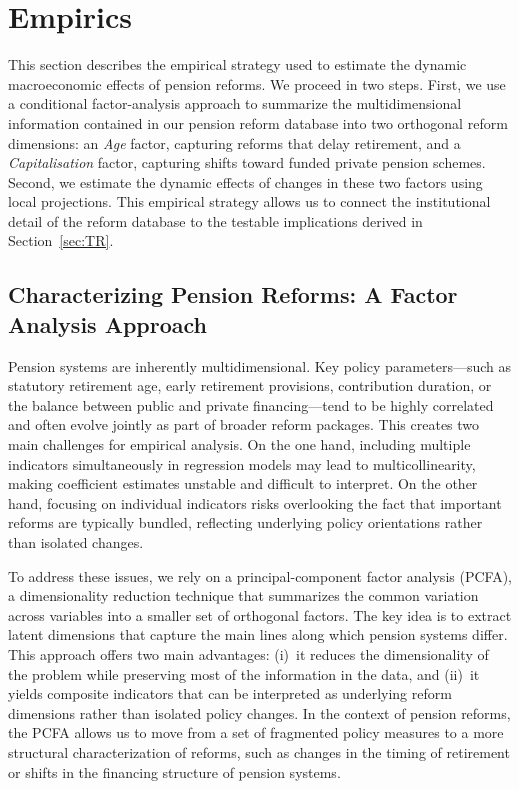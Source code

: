 \documentclass[11pt,english,a4paper, twoside, authoryear]{article}
\begin{document}
\section{Empirics}


This section describes the empirical strategy used to estimate the dynamic macroeconomic effects of pension reforms. We proceed in two steps. First, we use a conditional factor-analysis approach to summarize the multidimensional information contained in our pension reform database into two orthogonal reform dimensions: an \emph{Age} factor, capturing reforms that delay retirement, and a \emph{Capitalisation} factor, capturing shifts toward funded private pension schemes. Second, we estimate the dynamic effects of changes in these two factors using local projections. This empirical strategy allows us to connect the institutional detail of the reform database to the testable implications derived in Section~\ref{sec:TR}.


\subsection{Characterizing Pension Reforms: A Factor Analysis Approach}
\label{sec:pcfa}

Pension systems are inherently multidimensional. Key policy parameters---such as statutory retirement age, early retirement provisions, contribution duration, or the balance between public and private financing---tend to be highly correlated and often evolve jointly as part of broader reform packages. This creates two main challenges for empirical analysis. On the one hand, including multiple indicators simultaneously in regression models may lead to multicollinearity, making coefficient estimates unstable and difficult to interpret. On the other hand, focusing on individual indicators risks overlooking the fact that important reforms are typically bundled, reflecting underlying policy orientations rather than isolated changes.

To address these issues, we rely on a principal-component factor analysis (PCFA), a dimensionality reduction technique that summarizes the common variation across variables into a smaller set of orthogonal factors. The key idea is to extract latent dimensions that capture the main lines along which pension systems differ. This approach offers two main advantages: (i)~it reduces the dimensionality of the problem while preserving most of the information in the data, and (ii)~it yields composite indicators that can be interpreted as underlying reform dimensions rather than isolated policy changes. In the context of pension reforms, the PCFA allows us to move from a set of fragmented policy measures to a more structural characterization of reforms, such as changes in the timing of retirement or shifts in the financing structure of pension systems. %
\end{document}
